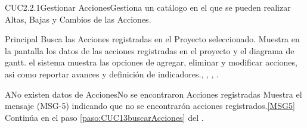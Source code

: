 %  
	\begin{UseCase}{CUC2.2.1}{Gestionar Acciones}{Gestiona un catálogo en el que se pueden realizar Altas, Bajas y Cambios de las Acciones.}
	\end{UseCase}
	
		
	\begin{UCtrayectoria}{Principal}
		\UCpaso Busca las Acciones registradas en el Proyecto seleccionado. \label{paso:CUC13buscarAcciones}
		\UCpaso Muestra en la pantalla  los datos de las acciones registradas en el proyecto y el diagrama de gantt.
		\UCpaso el sistema muestra las opciones de agregar, eliminar y modificar acciones, asi como reportar avances y definición de indicadores., , , .
	\end{UCtrayectoria}
	
	\begin{UCtrayectoriaA}{A}{No existen datos de Acciones}{No se encontraron Acciones registradas}
			\UCpaso[\UCactor] Muestra el mensaje (MSG-5) indicando que no se encontrarón acciones registrados.\ref{MSG5}
			\UCpaso Continúa en el paso \ref{paso:CUC13buscarAcciones} del .
	\end{UCtrayectoriaA}


